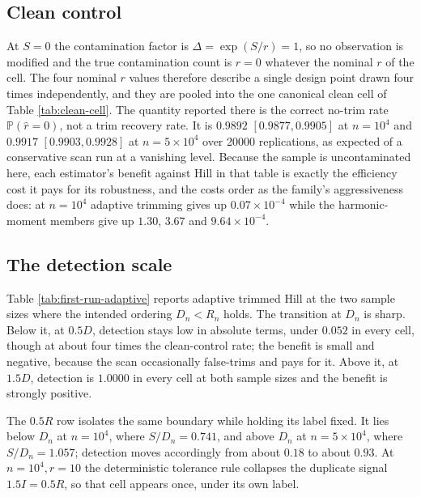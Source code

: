 \documentclass[11pt]{article}
\newcommand{\Pp}{\mathbb{P}}
\begin{document}
\subsection{Clean control}

At $S=0$ the contamination factor is $\Delta=\exp(S/r)=1$, so no observation is
modified and the true contamination count is $r=0$ whatever the nominal $r$ of
the cell.  The four nominal $r$ values therefore describe a single design point
drawn four times independently, and they are pooled into the one canonical
clean cell of Table \ref{tab:clean-cell}.  The quantity reported there is the
correct no-trim rate $\Pp(\widehat r=0)$, not a trim recovery rate.  It is
$0.9892$ $[0.9877,0.9905]$ at $n=10^4$ and $0.9917$ $[0.9903,0.9928]$ at
$n=5\times10^4$ over 20000 replications, as expected of a conservative scan run
at a vanishing level.  Because the sample is uncontaminated here, each
estimator's benefit against Hill in that table is exactly the efficiency cost
it pays for its robustness, and the costs order as the family's aggressiveness
does: at $n=10^4$ adaptive trimming gives up $0.07\times10^{-4}$ while the
harmonic-moment members give up $1.30$, $3.67$ and $9.64\times10^{-4}$.



\subsection{The detection scale}

Table \ref{tab:first-run-adaptive} reports adaptive trimmed Hill at the two
sample sizes where the intended ordering $D_n<R_n$ holds.  The transition at
$D_n$ is sharp.  Below it, at $0.5D$, detection stays low in absolute terms, under
$0.052$ in every cell, though at about four times the clean-control rate; the
benefit is small and negative, because the scan occasionally false-trims and
pays for it.  Above it, at $1.5D$, detection is $1.0000$ in every cell at
both sample sizes and the benefit is strongly positive.

The $0.5R$ row isolates the same boundary while holding its label fixed.  It
lies below $D_n$ at $n=10^4$, where $S/D_n=0.741$, and above $D_n$ at
$n=5\times10^4$, where $S/D_n=1.057$; detection moves accordingly from about
$0.18$ to about $0.93$.  At $n=10^4,r=10$ the deterministic tolerance rule
collapses the duplicate signal $1.5I=0.5R$, so that cell appears once, under
its own label.


\end{document}
